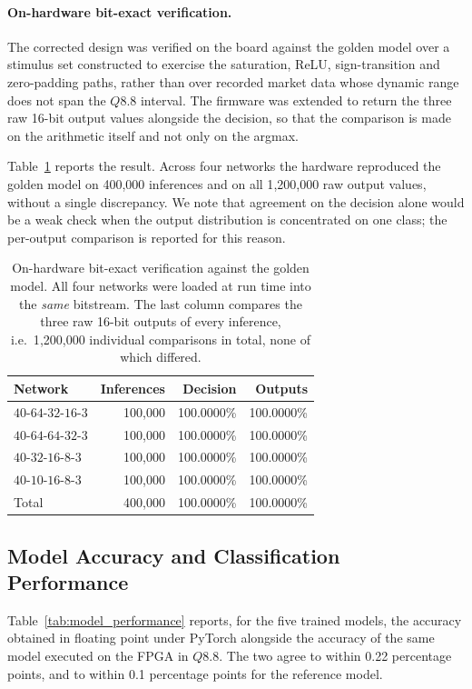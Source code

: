 \documentclass[final,5p,times,twocolumn]{elsarticle}
\begin{document}
\paragraph{On-hardware bit-exact verification.}
The corrected design was verified on the board against the golden model over a
stimulus set constructed to exercise the saturation, ReLU, sign-transition and
zero-padding paths, rather than over recorded market data whose dynamic range
does not span the $Q8.8$ interval. The firmware was extended to return the three
raw 16-bit output values alongside the decision, so that the comparison is
made on the arithmetic itself and not only on the argmax.

Table~\ref{tab:verification} reports the result. Across four networks the
hardware reproduced the golden model on 400{,}000 inferences and on all
1{,}200{,}000 raw output values, without a single discrepancy. We note that
agreement on the decision alone would be a weak check when the output
distribution is concentrated on one class; the per-output comparison is reported
for this reason.

\begin{table}[htbp]
\centering
\caption{On-hardware bit-exact verification against the golden model. All four
networks were loaded at run time into the \emph{same} bitstream. The last column
compares the three raw 16-bit outputs of every inference, i.e.\ 1{,}200{,}000
individual comparisons in total, none of which differed.}
\label{tab:verification}
\small
\begin{tabular}{@{}lrrr@{}}
\toprule
Network & Inferences & Decision & Outputs \\
\midrule
$40$-$64$-$32$-$16$-$3$ & 100{,}000 & 100.0000\% & 100.0000\% \\
$40$-$64$-$64$-$32$-$3$ & 100{,}000 & 100.0000\% & 100.0000\% \\
$40$-$32$-$16$-$8$-$3$  & 100{,}000 & 100.0000\% & 100.0000\% \\
$40$-$10$-$16$-$8$-$3$  & 100{,}000 & 100.0000\% & 100.0000\% \\
\midrule
Total                   & 400{,}000 & 100.0000\% & 100.0000\% \\
\bottomrule
\end{tabular}
\end{table}

\subsection{Model Accuracy and Classification Performance}
Table~\ref{tab:model_performance} reports, for the five trained models, the
accuracy obtained in floating point under PyTorch alongside the accuracy of the
same model executed on the FPGA in $Q8.8$. The two agree to within 0.22
percentage points, and to within 0.1 percentage points for the reference model.
\end{document}
